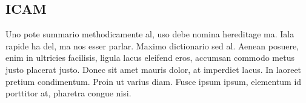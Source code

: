\subsection{ICAM}
\label{subsec:background:first_section:first_subsection}
Uno pote summario methodicamente al, uso debe nomina hereditage ma. Iala rapide ha del, ma nos esser parlar. Maximo dictionario sed al. Aenean posuere, enim in ultricies facilisis, ligula lacus eleifend eros, accumsan commodo metus justo placerat justo. Donec sit amet mauris dolor, at imperdiet lacus. In laoreet pretium condimentum. Proin ut varius diam. Fusce ipsum ipsum, elementum id porttitor at, pharetra congue nisi.
